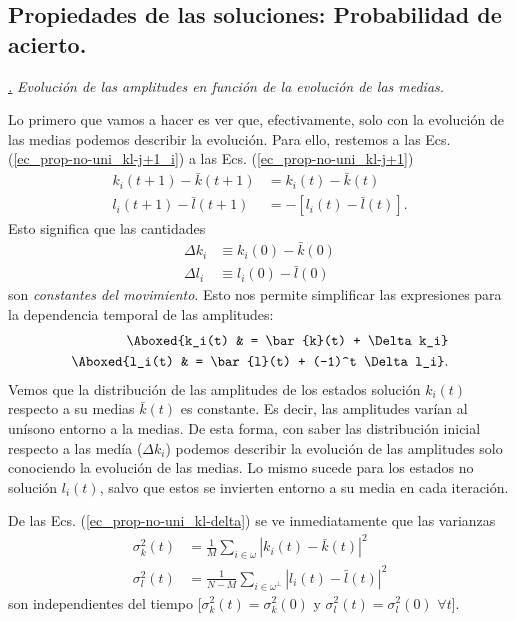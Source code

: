 \documentclass[a4paper,11pt]{book} %
\numberwithin{equation}{chapter}
\def\lc{\left[}
\def\rc{\right]}
\def\subsubiContadorIt{\par\addtocounter{subsubsection}{1}\underline{\it\thesubsubsection.}\hskip0.5cm \setcounter{subsubsubsectionIt}{0}}
\newcommand{\SubsubiIt}[1]{
		\subsubiContadorIt \textit{#1}
	}
\newcounter{subsubsubsectionIt}[subsubsection]
\begin{document}
\subsection{Propiedades de las soluciones: Probabilidad de acierto.}


\SubsubiIt{Evolución de las amplitudes en función de la evolución de las medias.} 

Lo primero que vamos a hacer es ver que, efectivamente, solo con la evolución de las medias podemos describir la evolución. 
Para ello, restemos a las Ecs. (\ref{ec_prop-no-uni_kl-j+1_i}) a las Ecs. (\ref{ec_prop-no-uni_kl-j+1}) 
\begin{align*}
k_i(t+1) - \bar{k}(t+1) & = k_i(t) - \bar{k}(t) \\
l_i(t+1) - \bar{l}(t+1) & = - \lc l_i(t) - \bar{l}(t) \rc.
\end{align*}
Esto significa que las cantidades
\begin{equation} 
\begin{aligned}
\Delta k_i & \equiv k_i(0) - \bar{k}(0) \\
\Delta l_i & \equiv l_i(0) - \bar{l}(0) 
\end{aligned}
\end{equation}
son \textit{constantes del movimiento}. Esto nos permite simplificar las expresiones para la dependencia temporal de las amplitudes:
\begin{equation} \label{ec_prop-no-uni_kl-delta} 
\begin{aligned}
\Aboxed{k_i(t) & = \bar{k}(t) + \Delta k_i} \\
\Aboxed{l_i(t) & = \bar{l}(t) + (-1)^t \Delta l_i}. 
\end{aligned}
\end{equation}
Vemos que  la distribución de las amplitudes de los estados solución $k_i(t)$ respecto a su medias $\bar{k}(t)$ es constante. Es decir, las amplitudes varían al unísono entorno a la medias. De esta forma, con saber las distribución inicial respecto a las medía ($\Delta k_i$) podemos describir la evolución de las amplitudes solo conociendo la evolución de las medias. Lo mismo sucede para los estados no solución $l_i(t)$, salvo que estos se invierten entorno a su media en cada iteración.

De las Ecs. (\ref{ec_prop-no-uni_kl-delta}) se ve inmediatamente que las varianzas
\begin{align*}
\sigma_k^2 (t) & = \frac{1}{M} \sum_{i \in \omega} |k_i(t) - \bar{k}(t)|^2   \\
\sigma_l^2 (t) & = \frac{1}{N-M} \sum_{i \in \omega^\perp} |l_i(t) - \bar{l}(t)|^2 
\end{align*}
son independientes del tiempo [$\sigma_k^2 (t) = \sigma_k^2 (0)$ y $\sigma_l^2 (t)=\sigma_l^2 (0)$ $ \forall t$].
\end{document}
